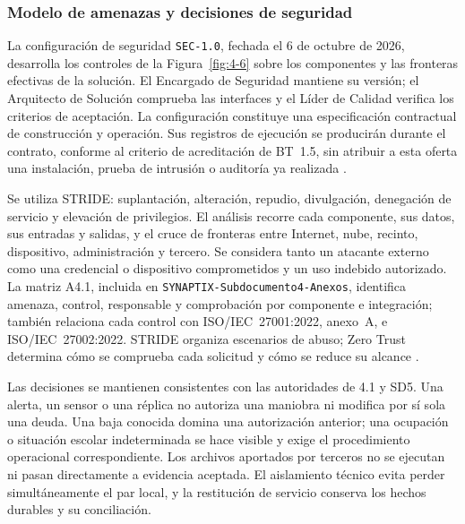 \subsubsection{Modelo de amenazas y decisiones de seguridad}
\label{sec:4-seguridad-rt}

La configuración de seguridad \texttt{SEC-1.0}, fechada el 6 de octubre de 2026, desarrolla los controles de la Figura~\ref{fig:4-6} sobre los componentes y las fronteras efectivas de la solución. El Encargado de Seguridad mantiene su versión; el Arquitecto de Solución comprueba las interfaces y el Líder de Calidad verifica los criterios de aceptación. La configuración constituye una especificación contractual de construcción y operación. Sus registros de ejecución se producirán durante el contrato, conforme al criterio de acreditación de BT~1.5, sin atribuir a esta oferta una instalación, prueba de intrusión o auditoría ya realizada \parencite[secc.~1.5, p.~4; RT-11.01--06, p.~23]{pucv-transversal}.

Se utiliza STRIDE: suplantación, alteración, repudio, divulgación, denegación de servicio y elevación de privilegios. El análisis recorre cada componente, sus datos, sus entradas y salidas, y el cruce de fronteras entre Internet, nube, recinto, dispositivo, administración y tercero. Se considera tanto un atacante externo como una credencial o dispositivo comprometidos y un uso indebido autorizado. La matriz A4.1, incluida en \texttt{SYNAPTIX-Subdocumento4-Anexos}, identifica amenaza, control, responsable y comprobación por componente e integración; también relaciona cada control con ISO/IEC~27001:2022, anexo~A, e ISO/IEC~27002:2022. STRIDE organiza escenarios de abuso; Zero Trust determina cómo se comprueba cada solicitud y cómo se reduce su alcance \parencites{sec-stride,sec-iso27001,sec-iso27002,nist-zero-trust}.

Las decisiones se mantienen consistentes con las autoridades de 4.1 y SD5. Una alerta, un sensor o una réplica no autoriza una maniobra ni modifica por sí sola una deuda. Una baja conocida domina una autorización anterior; una ocupación o situación escolar indeterminada se hace visible y exige el procedimiento operacional correspondiente. Los archivos aportados por terceros no se ejecutan ni pasan directamente a evidencia aceptada. El aislamiento técnico evita perder simultáneamente el par local, y la restitución de servicio conserva los hechos durables y su conciliación.

